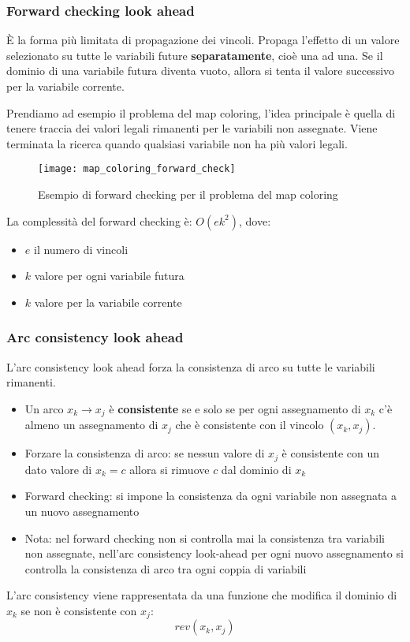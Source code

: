 \documentclass[a4paper]{article}
\begin{document}
\subsubsection{Forward checking look ahead}
È la forma più limitata di propagazione dei vincoli. Propaga l'effetto di un valore
selezionato su tutte le variabili future \textbf{separatamente}, cioè una ad una.
Se il dominio di una variabile futura diventa vuoto, allora si tenta il valore successivo
per la variabile corrente.
\begin{example}
  Prendiamo ad esempio il problema del map coloring, l'idea principale è quella di tenere
  traccia dei valori legali rimanenti per le variabili non assegnate. Viene terminata
  la ricerca quando qualsiasi variabile non ha più valori legali.
  \begin{figure}[H]
    \centering
    \texttt{[image: map\_coloring\_forward\_check]}
    \caption{Esempio di forward checking per il problema del map coloring}
  \end{figure}
\end{example}
La complessità del forward checking è: \( O(ek^2) \), dove:
\begin{itemize}
  \item \( e \) il numero di vincoli
  \item \( k \) valore per ogni variabile futura
  \item \( k \) valore per la variabile corrente
\end{itemize}

\subsubsection{Arc consistency look ahead}
L'arc consistency look ahead forza la consistenza di arco su tutte le variabili rimanenti.

\begin{itemize}
  \item Un arco \( x_k \to x_j \) è \textbf{consistente} se e solo se per ogni assegnamento di
    \( x_k \) c'è almeno un assegnamento di \( x_j \) che è consistente con il vincolo
    \( (x_k, x_j) \). 

  \item Forzare la consistenza di arco: se nessun valore di \( x_j \) è consistente
    con un dato valore di \( x_k = c \) allora si rimuove \( c \) dal dominio di \( x_k \)

  \item Forward checking: si impone la consistenza da ogni variabile non assegnata
    a un nuovo assegnamento

  \item Nota: nel forward checking non si controlla mai la consistenza tra variabili
    non assegnate, nell'arc consistency look-ahead per ogni nuovo assegnamento
    si controlla la consistenza di arco tra ogni coppia di variabili
\end{itemize}
L'arc consistency viene rappresentata da una funzione che modifica il dominio di
\( x_k \) se non è consistente con \( x_j \):
\[
  rev(x_k, x_j)
\] 
\end{document}
